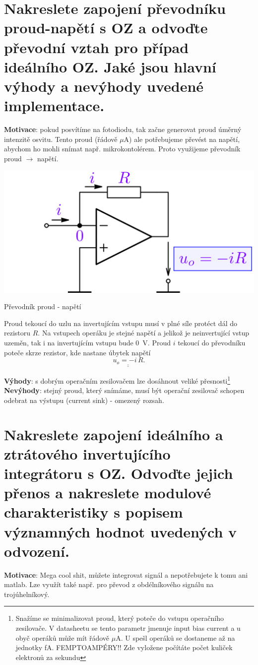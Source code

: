 \documentclass[a4paper,12pt]{article}   %
\begin{document}
\section{Nakreslete zapojení převodníku proud-napětí s OZ a odvoďte převodní vztah pro případ ideálního OZ. Jaké jsou hlavní výhody a nevýhody uvedené implementace.}
\textbf{Motivace}: pokud posvítíme na fotodiodu, tak začne generovat proud úměrný intenzitě osvitu. Tento proud (řádově $\mu$A) ale potřebujeme převést na napětí, abychom ho mohli snímat např. mikrokontolérem. Proto využijeme převodník proud $\rightarrow$ napětí.
\begin{schema}
    \centering
    \includegraphics[width=.4\textwidth]{prevodnik-iu.PNG}
    \caption{Převodník proud - napětí}
    \label{sch:prevodnik:iu}
\end{schema}
Proud tekoucí do uzlu na invertujícím vstupu musí v plné síle protéct dál do rezistoru $R$. Na vstupech operáku je stejné napětí a jelikož je neinvertující vstup uzeměn, tak i na invertujícím vstupu bude $0$~V. Proud $i$ tekoucí do převodníku poteče skrze rezistor, kde nastane úbytek napětí
\begin{equation}
    \underline{\underline{u_o = -i\,R}}.
\end{equation}

\textbf{Výhody}: s dobrým operačním zesilovačem lze dosáhnout veliké přesnosti\footnote{Snažíme se minimalizovat proud, který poteče do vstupu operačního zesilovače. V datasheetu se tento parametr jmenuje input bias current a u obyč operáků může mít řádově $\mu$A. U spešl operáků se dostaneme až na jednotky fA. FEMPTOAMPÉRY!! Zde vyložene počítáte počet kuliček elektronů za sekundu}\\
\textbf{Nevýhody}: stejný proud, který snímáme, musí být operační zesilovač schopen odebrat na výstupu (current sink) - omezený rozsah.






\section{Nakreslete zapojení ideálního a ztrátového invertujícího integrátoru s OZ. Odvoďte jejich přenos a nakreslete modulové charakteristiky s popisem významných hodnot uvedených v odvození.}
\textbf{Motivace}: Mega cool shit, můžete integrovat signál a nepotřebujete k tomu ani matlab. Lze využít také např. pro převod z obdélníkového signálu na trojúhelníkový. 
\end{document}
